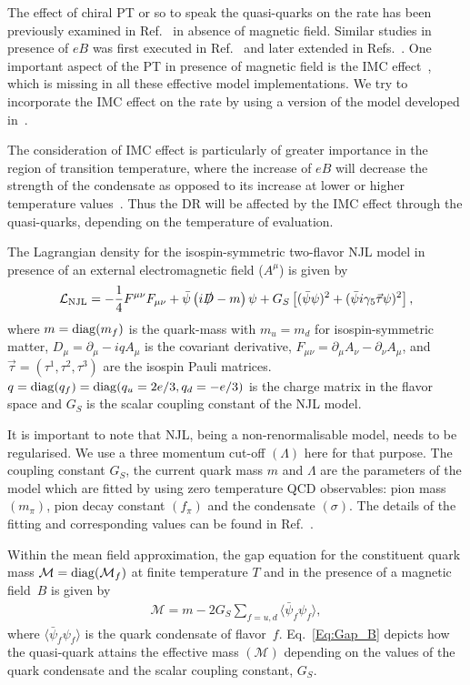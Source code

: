 \documentclass[aps,prd,floatfix,showpacs,showkeys,superscriptadress,unsortedaddress,nofootinbib,onecolumn]{revtex4-1}
\newcommand{\be}{\begin{eqnarray}}
\newcommand{\ee}{\end{eqnarray}}
\begin{document}
The effect of chiral PT or so to speak the quasi-quarks on the rate has been previously examined in Ref.~\cite{Islam:2014sea} in absence of magnetic field. Similar studies in presence of $eB$ was first executed in Ref.~\cite{Islam:2018sog} and later extended in Refs.~\cite{Ghosh:2020xwp,Chaudhuri:2021skc}. One important aspect of the PT in presence of magnetic field is the IMC effect~\cite{Bali:2012zg,Bali:2011qj}, which is missing in all these effective model implementations. We try to incorporate the IMC effect on the rate by using a version of the model developed in~\cite{Farias:2016gmy}.

The consideration of IMC effect is particularly of greater importance in the region of transition temperature, where the increase of $eB$ will decrease the strength of the condensate as opposed to its increase at lower or higher temperature values~\cite{Bali:2012zg,Bali:2011qj}. Thus the DR will be affected by the IMC effect through the quasi-quarks, depending on the temperature of evaluation.

The Lagrangian density for the isospin-symmetric two-flavor NJL model in presence of an external electromagnetic field ($A^\mu$) is given by
\be
\mathcal{L}_{\rm NJL}= -\frac{1}{4} F^{\mu\nu}F_{\mu\nu}
+ \bar{\psi}\left(i\slashed{D}-m\right)\psi
+ G_S\left[ (\bar{\psi}\psi)^2+(\bar{\psi}i\gamma_5{\vec\tau}\psi)^2\right],
\label{NJL_lag}
\ee
%
where $m = {\rm diag}(m_f)$ is the quark-mass with $m_u=m_d$ for isospin-symmetric matter,
$D_\mu = \partial_\mu - iq A_\mu$ is the covariant derivative, $F_{\mu\nu} = \partial_\mu A_\nu - \partial_\nu A_\mu$, and $\vec \tau = (\tau^1, \tau^2, \tau^3)$ are the isospin Pauli matrices. $q = {\rm diag}(q_f) ={\rm diag}(q_u = 2e/3, q_d =-e/3)$ is the charge matrix in the flavor space and $G_S$ is the scalar coupling constant of the NJL model. 

It is important to note that NJL, being a non-renormalisable model, needs to be regularised. We use a three momentum cut-off $(\Lambda)$ here for that purpose. The coupling constant $G_S$, the current quark mass $m$ and $\Lambda$ are the parameters of the model which are fitted by using zero temperature QCD observables: pion mass $(m_\pi)$, pion decay constant $(f_\pi)$ and the condensate $(\sigma)$. The details of the fitting and corresponding values can be found in Ref.~\cite{Farias:2016gmy}.

Within the mean field approximation, the gap equation for the constituent quark mass $\mathcal{M}={\rm diag}(\mathcal{M}_f)$ at finite temperature $T$ and in the presence of a magnetic field~$B$ is given by
%
\begin{align}
\mathcal{M} = m - 2 G_S  \sum_{f=u,d}\langle \bar{\psi}_f\psi_f\rangle,
\label{Eq:Gap_B}
\end{align}
%
where $\langle \bar{\psi}_f\psi_f\rangle$ is the quark condensate of flavor~$f$. Eq.~\ref{Eq:Gap_B} depicts how the quasi-quark attains the effective mass $(\mathcal{M})$ depending on the values of the quark condensate and the scalar coupling constant, $G_S$.
\end{document}

